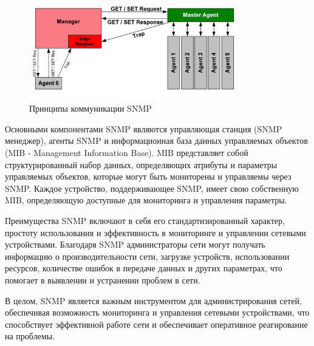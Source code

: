 \begin{figure}[H]
    \centering
    \includegraphics*[width=0.8\textwidth]{img/SNMP_communication_principles_diagram.PNG}
    \caption{Принципы коммуникации SNMP}
\end{figure}

Основными компонентами SNMP являются управляющая станция (SNMP менеджер), агенты SNMP и информационная база данных
управляемых объектов (MIB - Management Information Base). MIB представляет собой структурированный набор данных,
определяющих атрибуты и параметры управляемых объектов, которые могут быть мониторены и управляемы через SNMP.
Каждое устройство, поддерживающее SNMP, имеет свою собственную MIB, определяющую доступные для мониторинга и управления параметры.

Преимущества SNMP включают в себя его стандартизированный характер, простоту использования и эффективность в мониторинге
и управлении сетевыми устройствами. Благодаря SNMP администраторы сети могут получать информацию о производительности
сети, загрузке устройств, использовании ресурсов, количестве ошибок в передаче данных и других параметрах, что
помогает в выявлении и устранении проблем в сети.

В целом, SNMP является важным инструментом для администрирования сетей, обеспечивая возможность мониторинга и управления
сетевыми устройствами, что способствует эффективной работе сети и обеспечивает оперативное реагирование на проблемы.